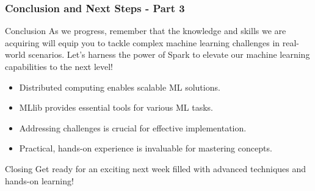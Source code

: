 \documentclass[aspectratio=169]{beamer}
\begin{document}
\begin{frame}[fragile]
    \frametitle{Conclusion and Next Steps - Part 3}
    
    \begin{block}{Conclusion}
        As we progress, remember that the knowledge and skills we are acquiring will equip you to tackle complex machine learning challenges in real-world scenarios. Let’s harness the power of Spark to elevate our machine learning capabilities to the next level!
    \end{block}
    
    \begin{itemize}
        \item Distributed computing enables scalable ML solutions.
        \item MLlib provides essential tools for various ML tasks.
        \item Addressing challenges is crucial for effective implementation.
        \item Practical, hands-on experience is invaluable for mastering concepts.
    \end{itemize}

    \begin{block}{Closing}
        Get ready for an exciting next week filled with advanced techniques and hands-on learning!
    \end{block}
\end{frame}
\end{document}
